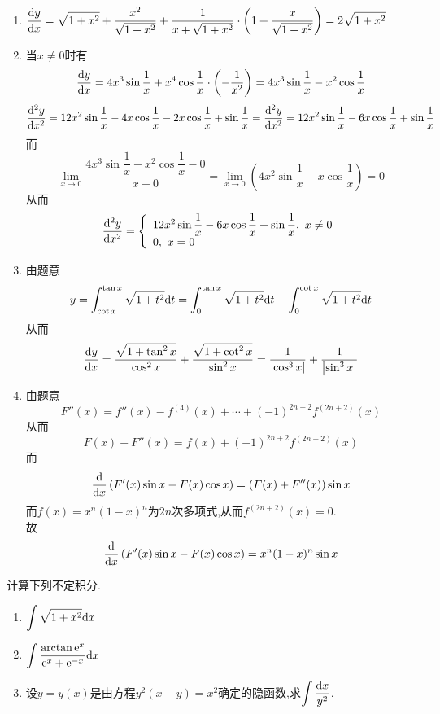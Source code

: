 \documentclass{ctexart}
\begin{document}
\begin{solution}[Solution.]
    \begin{enumerate}[leftmargin=*,label=\textbf{(\arabic*)}]
        \item $\displaystyle\dfrac{\mathrm{d} y}{\mathrm{d} x}
            =\sqrt{1+x^2}+\dfrac{x^2}{\sqrt{1+x^2}}+\dfrac{1}{x+\sqrt{1+x^2}}\cdot\left(1+\dfrac{x}{\sqrt{1+x^2}}\right)
            =2\sqrt{1+x^2}$
        \item 当$x\neq0$时有
            $$\dfrac{\mathrm{d} y}{\mathrm{d} x}=4x^3\sin{\dfrac{1}{x}}+x^4\cos\dfrac{1}{x}\cdot\left(-\dfrac{1}{x^2}\right)=4x^3\sin{\dfrac{1}{x}}-x^2\cos{\dfrac{1}{x}}$$
            $$\dfrac{\mathrm{d}^2y}{\mathrm{d} x^2}=12x^2\sin\dfrac{1}{x}-4x\cos\dfrac{1}{x}-2x\cos\dfrac{1}{x}+\sin\dfrac{1}{x}=\dfrac{\mathrm{d}^2y}{\mathrm{d} x^2}=12x^2\sin\dfrac{1}{x}-6x\cos\dfrac{1}{x}+\sin\dfrac{1}{x}$$
            而$$\lim_{x\to 0}{\dfrac{4x^3\sin{\dfrac{1}{x}}-x^2\cos{\dfrac{1}{x}}-0}{x-0}}=\lim_{x\to0}\left(4x^2\sin{\dfrac{1}{x}}-x\cos\dfrac{1}{x}\right)=0$$
            从而
            $$\dfrac{\di^2 y}{\dx^2}=\left\{
            \begin{array}{l}
                12x^2\sin\dfrac{1}{x}-6x\cos\dfrac{1}{x}+\sin\dfrac{1}{x},\ x\neq 0 \\
                0,\ x=0
            \end{array}
            \right.$$
        \item 由题意$$y=\int_{\cot x}^{\tan x}\sqrt{1+t^2}\mathrm{d} t=\int_{0}^{\tan x}\sqrt{1+t^2}\mathrm{d} t-\int_{0}^{\cot x}\sqrt{1+t^2}\mathrm{d} t$$
            从而$$\dfrac{\mathrm{d} y}{\mathrm{d} x}=\dfrac{\sqrt{1+\tan^2x}}{\cos^2x}+\dfrac{\sqrt{1+\cot^2x}}{\sin^2x}=\dfrac{1}{\left|\cos^3x\right|}+\dfrac{1}{\left|\sin^3x\right|}$$
        \item 由题意$$F''(x)=f''(x)-f^{(4)}(x)+\cdots+(-1)^{2n+2}f^{(2n+2)}(x)$$
            从而$$F(x)+F''(x)=f(x)+(-1)^{2n+2}f^{(2n+2)}(x)$$
            而$$\dfrac{\mathrm{d}}{\mathrm{d} x}\left(F'(x)\sin x-F(x)\cos x\right)=(F(x)+F''(x))\sin x$$
            而$f(x)=x^n(1-x)^n$为$2n$次多项式,从而$f^{(2n+2)}(x)=0$.\\
            故$$\dfrac{\mathrm{d}}{\mathrm{d} x}\left(F'(x)\sin x-F(x)\cos x\right)=x^n(1-x)^n\sin x$$
    \end{enumerate}
\end{solution}
\begin{problem}[3.(15\songti{分})]
    计算下列不定积分.
        \begin{enumerate}[label=\textbf{(\arabic*)}]
            \item $\displaystyle\int\sqrt{1+x^2}\mathrm{d} x$
            \item $\displaystyle\int\dfrac{\arctan \mathrm{e}^x}{\mathrm{e}^x+\mathrm{e}^{-x}}\mathrm{d} x$
            \item 设$y=y(x)$是由方程$y^2(x-y)=x^2$确定的隐函数,求$\displaystyle\int{\dfrac{\mathrm{d}x}{y^2}}$.
        \end{enumerate}
\end{problem}
\end{document}
